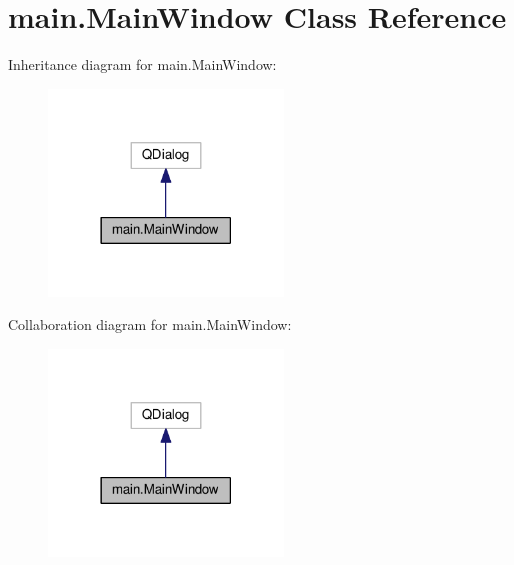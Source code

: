 \hypertarget{classmain_1_1_main_window}{}\section{main.\+Main\+Window Class Reference}
\label{classmain_1_1_main_window}


Inheritance diagram for main.\+Main\+Window\+:
\nopagebreak
\begin{figure}[H]
\begin{center}
\leavevmode
\includegraphics[width=177pt]{classmain_1_1_main_window__inherit__graph}
\end{center}
\end{figure}


Collaboration diagram for main.\+Main\+Window\+:
\nopagebreak
\begin{figure}[H]
\begin{center}
\leavevmode
\includegraphics[width=177pt]{classmain_1_1_main_window__coll__graph}
\end{center}
\end{figure}
